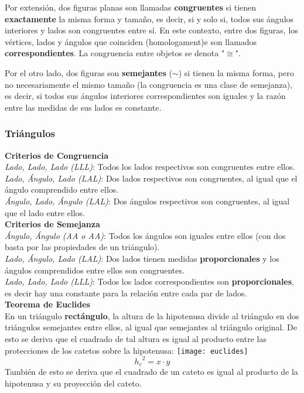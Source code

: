 Por extensión, dos figuras planas son llamadas \textbf{congruentes} si tienen \textbf{exactamente} la misma forma y tamaño, es decir, si y solo si, todos sus ángulos interiores y lados son congruentes entre sí.
En este contexto, entre dos figuras, los vértices, lados y ángulos que coinciden (homologament)e son llamados \textbf{correspondientes}. La congruencia entre objetos se denota "$\cong$".

Por el otro lado, dos figuras son \textbf{semejantes} ($\sim$) si tienen la misma forma, pero no necesariamente el mismo tamaño (la congruencia es una clase de semejanza), es decir, si todos sus ángulos interiores correspondientes son iguales y la razón entre las medidas de sus lados es constante.

\subsubsection{Triángulos}
\textbf{Criterios de Congruencia}\\
\textit{Lado, Lado, Lado (LLL)}: Todos los lados respectivos son congruentes entre ellos.\\
\textit{Lado, Ángulo, Lado (LAL)}: Dos lados respectivos son congruentes, al igual que el ángulo comprendido entre ellos.\\
\textit{Ángulo, Lado, Ángulo (LAL)}: Dos ángulos respectivos son congruentes, al igual que el lado entre ellos.\\

\textbf{Criterios de Semejanza}\\
\textit{Ángulo, Ángulo (AA o AA)}: Todos los ángulos son iguales entre ellos (con dos basta por las propiedades de un triángulo).\\
\textit{Lado, Ángulo, Lado (LAL)}: Dos lados tienen medidas \textbf{proporcionales} y los ángulos comprendidos entre ellos son congruentes.\\
\textit{Lado, Lado, Lado (LLL)}: Todos los lados correspondientes son \textbf{proporcionales}, es decir hay una constante para la relación entre cada par de lados.\\

\textbf{Teorema de Euclides}\\
En un triángulo \textbf{rectángulo}, la altura de la hipotenusa divide al triángulo en dos triángulos semejantes entre ellos, al igual que semejantes al triángulo original. De esto se deriva que el cuadrado de tal altura es igual al producto entre las protecciones de los catetos sobre la hipotenusa:
\texttt{[image: euclides]}
\begin{equation*}
{h_c}^2 = x \cdot y
\end{equation*}
También de esto se deriva que el cuadrado de un cateto es igual al producto de la hipotenusa y su proyección del cateto.

